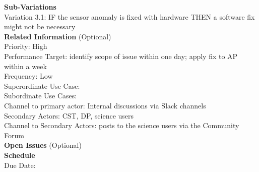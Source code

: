{\bf Sub-Variations} \\
Variation 3.1: IF the sensor anomaly is fixed with hardware THEN a software fix might not be necessary \\

{\bf Related Information} (Optional) \\
Priority: High  \\
Performance Target: identify scope of issue within one day; apply fix to AP within a week \\
Frequency: Low \\
Superordinate Use Case:  \\
Subordinate Use Cases: \\
Channel to primary actor: Internal discussions via Slack channels \\
Secondary Actors: CST, DP, science users \\
Channel to Secondary Actors: posts to the science users via the Community Forum \\

{\bf Open Issues} (Optional) \\

{\bf Schedule} \\
Due Date: \\
